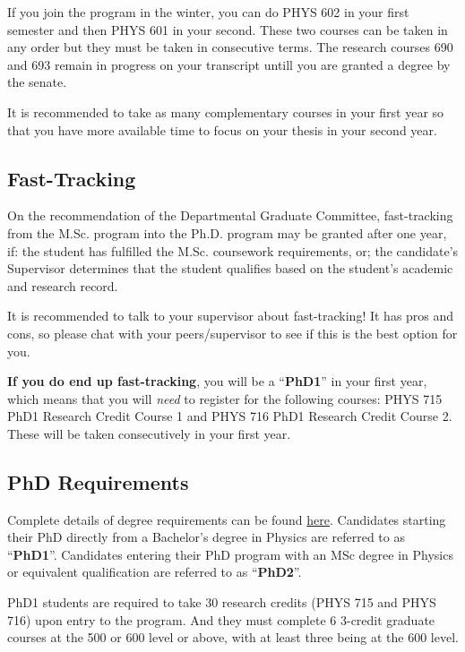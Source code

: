     If you join the program in the winter, you can do PHYS 602 in your first semester and then PHYS 601 in your second. These two courses can be taken in any order but they must be taken in consecutive terms. The research courses 690 and 693 remain in progress on your transcript untill you are granted a degree by the senate.
    
    It is recommended to take as many complementary courses in your first year so that you have more available time to focus on your thesis in your second year.

    \subsection{Fast-Tracking} 
        On the recommendation of the Departmental Graduate Committee, fast-tracking from the M.Sc. program into the Ph.D. program may be granted after one year, if:  the student has fulfilled the M.Sc. coursework requirements, or;
        the candidate's Supervisor determines that the student qualifies based on the student's academic and research record.

        It is recommended to talk to your supervisor about fast-tracking! It has pros and cons, so please chat with your peers/supervisor to see if this is the best option for you.

        \textbf{If you do end up fast-tracking}, you will be a ``\textbf{PhD1}'' in your first year, which means that you will \textit{need} to register for the following courses: PHYS 715 PhD1 Research Credit Course 1 and PHYS 716 PhD1 Research Credit Course 2. These will be taken consecutively in your first year. 
    
    \subsection{PhD Requirements} 

    Complete details of degree requirements can be found \href{https://www.physics.mcgill.ca/grads/requirements.html}{here}. Candidates starting their PhD directly from a Bachelor's degree in Physics are referred to as ``\textbf{PhD1}''. Candidates entering their PhD program with an MSc degree in Physics or equivalent qualification are referred to as ``\textbf{PhD2}''.

     PhD1 students are required to take 30 research credits (PHYS 715 and PHYS 716) upon entry to the program. And they must complete 6 3-credit graduate courses at the 500 or 600 level or above, with at least three being at the 600 level. 
     
